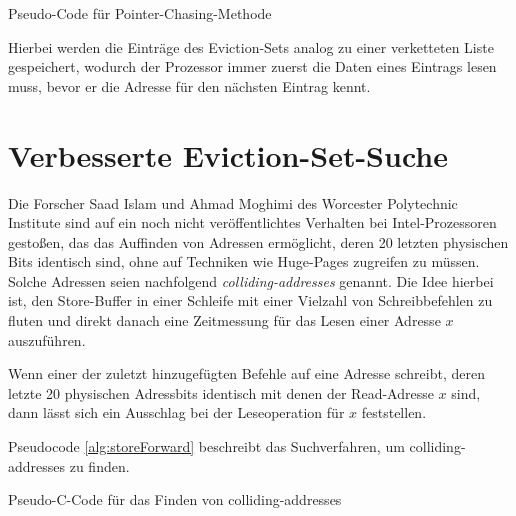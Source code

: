 \begin{algorithm}[h]
\DontPrintSemicolon
\caption{Pseudo-Code für Pointer-Chasing-Methode}
\label{alg:pointerChasing}

\end{algorithm}

Hierbei werden die Einträge des Eviction-Sets analog zu einer verketteten Liste gespeichert, wodurch der Prozessor immer zuerst die Daten eines Eintrags lesen muss, bevor er die Adresse für den nächsten Eintrag kennt.

\section{Verbesserte Eviction-Set-Suche}
\label{StoreFor}

Die Forscher Saad Islam und Ahmad Moghimi des Worcester Polytechnic Institute sind auf ein noch nicht veröffentlichtes Verhalten bei Intel-Prozessoren gestoßen, das das Auffinden von Adressen ermöglicht, deren 20 letzten physischen Bits identisch sind, ohne auf Techniken wie Huge-Pages zugreifen zu müssen.
Solche Adressen seien nachfolgend \textit{colliding-addresses} genannt.
Die Idee hierbei ist, den Store-Buffer in einer Schleife mit einer Vielzahl von Schreibbefehlen zu fluten und direkt danach eine Zeitmessung für das Lesen einer Adresse $x$ auszuführen.

Wenn einer der zuletzt hinzugefügten Befehle auf eine Adresse schreibt, deren letzte 20 physischen Adressbits identisch mit denen der Read-Adresse $x$ sind, dann lässt sich ein Ausschlag bei der Leseoperation für $x$ feststellen.

Pseudocode \ref{alg:storeForward} beschreibt das Suchverfahren, um colliding-addresses zu finden.

\begin{algorithm}[h]
\DontPrintSemicolon
\caption{Pseudo-C-Code für das Finden von colliding-addresses}
\label{alg:storeForward}

\end{algorithm}

